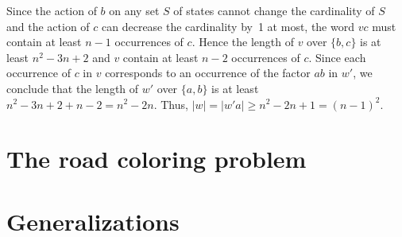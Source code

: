 \documentclass{irmaart}
\begin{document}
Since the action of $b$ on any set $S$ of states cannot change the
cardinality of $S$ and the action of $c$ can decrease the
cardinality by~1 at most, the word $vc$ must contain at least
$n-1$ occurrences of $c$. Hence the length of $v$ over $\{b,c\}$
is at least $n^2-3n+2$ and $v$ contain at least $n-2$ occurrences
of $c$. Since each occurrence of $c$ in $v$ corresponds to an
occurrence of the factor $ab$ in $w'$, we conclude that the length
of $w'$ over $\{a,b\}$ is at least $n^2-3n+2+n-2=n^2-2n$. Thus,
$|w|=|w'a|\ge n^2-2n+1=(n-1)^2$.


\section{The road coloring problem}
\label{KV:sec:rcp}

\section{Generalizations}


\begin{footnotesize}
  
\end{footnotesize}


\markright{\indexname}\markboth{\indexname}{\indexname}
\printindex
\end{document}
